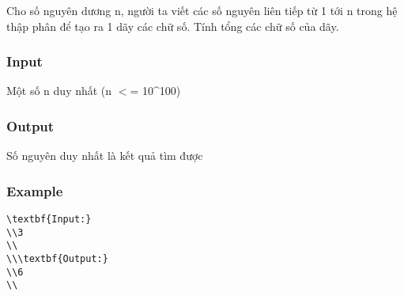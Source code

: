 



   Cho số nguyên dương n, người ta viết các số nguyên liên tiếp từ 1 tới n trong hệ thập phân để tạo ra 1 dãy các chữ số. Tính tổng các chữ số của dãy.  

\subsubsection{   Input  }

   Một số n duy nhất (n $<$= 10\textasciicircum100)  

\subsubsection{   Output  }

   Số nguyên duy nhất là kết quả tìm được  

\subsubsection{   Example  }
\begin{verbatim}
\textbf{Input:}
\\3
\\
\\\textbf{Output:}
\\6
\\\end{verbatim}